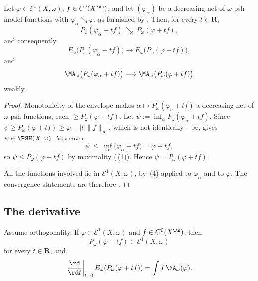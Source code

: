 \begin{lemma}
\label{lem:ch27-e1-envelope-approximation}
Let $\varphi\in\mathcal E^1(X,\omega)$, $f\in C^0(X^{\An})$, and let
$(\varphi_\alpha)$ be a decreasing net of $\omega$-psh model functions
with $\varphi_\alpha\searrow\varphi$, as furnished by
.  Then, for every $t\in\mathbf R$,
\[
 P_\omega(\varphi_\alpha+tf)\ \searrow\ P_\omega(\varphi+tf),
\]
and consequently
\[
 E_\omega\bigl(P_\omega(\varphi_\alpha+tf)\bigr)
 \longrightarrow E_\omega\bigl(P_\omega(\varphi+tf)\bigr),
\]
and
\[
 \MA_\omega\bigl(P_\omega(\varphi_\alpha+tf)\bigr)
 \longrightarrow
 \MA_\omega\bigl(P_\omega(\varphi+tf)\bigr)
\]
weakly.
\end{lemma}

\begin{proof}
Monotonicity of the envelope makes
$\alpha\mapsto P_\omega(\varphi_\alpha+tf)$ a decreasing net of
$\omega$-psh functions, each $\geq P_\omega(\varphi+tf)$.  Let
$\psi:=\inf_\alpha P_\omega(\varphi_\alpha+tf)$.  Since
$\psi\geq P_\omega(\varphi+tf)\geq\varphi-|t|\lVert f\rVert_\infty$, which
is not identically $-\infty$,  gives
$\psi\in\PSH(X,\omega)$.  Moreover
\[
 \psi\ \leq\ \inf_\alpha\bigl(\varphi_\alpha+tf\bigr)=\varphi+tf ,
\]
so $\psi\leq P_\omega(\varphi+tf)$ by maximality
(\,(1)).  Hence
$\psi=P_\omega(\varphi+tf)$.

All the functions involved lie in $\mathcal E^1(X,\omega)$, by
\,(4) applied to $\varphi_\alpha$ and
to $\varphi$.  The convergence statements are therefore
.
\end{proof}

\subsection{The derivative}
\label{sec:ch27-e1-derivative}

\begin{corollary}\label{cor:e1-projected-variation}
Assume orthogonality. If
$\varphi\in\mathcal E^1(X,\omega)$ and $f\in C^0(X^{\An})$, then
\[
 P_\omega(\varphi+tf)\in\mathcal E^1(X,\omega)
\]
for every $t\in\mathbf R$, and
\begin{equation}\label{eq:e1-projected-derivative}
 \left.\frac{\rd}{\rd t}\right|_{t=0}
 E_\omega(P_\omega(\varphi+tf))
 =\int f\,\MA_\omega(\varphi).
\end{equation}
\end{corollary}

